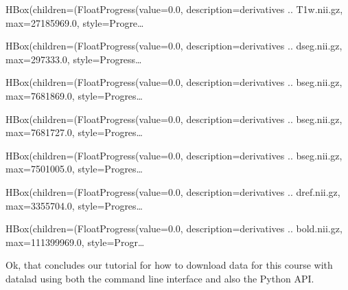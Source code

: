 \documentclass[letterpaper,10pt,english]{sphinxmanual}
\begin{document}
\begin{sphinxVerbatim}[commandchars=\\\{\}]
HBox(children=(FloatProgress(value=0.0, description=\PYGZsq{}derivatives .. \PYGZus{}T1w.nii.gz\PYGZsq{}, max=27185969.0, style=Progre…
\end{sphinxVerbatim}

\begin{sphinxVerbatim}[commandchars=\\\{\}]
HBox(children=(FloatProgress(value=0.0, description=\PYGZsq{}derivatives .. dseg.nii.gz\PYGZsq{}, max=297333.0, style=Progress…
\end{sphinxVerbatim}

\begin{sphinxVerbatim}[commandchars=\\\{\}]
HBox(children=(FloatProgress(value=0.0, description=\PYGZsq{}derivatives .. bseg.nii.gz\PYGZsq{}, max=7681869.0, style=Progres…
\end{sphinxVerbatim}

\begin{sphinxVerbatim}[commandchars=\\\{\}]
HBox(children=(FloatProgress(value=0.0, description=\PYGZsq{}derivatives .. bseg.nii.gz\PYGZsq{}, max=7681727.0, style=Progres…
\end{sphinxVerbatim}

\begin{sphinxVerbatim}[commandchars=\\\{\}]
HBox(children=(FloatProgress(value=0.0, description=\PYGZsq{}derivatives .. bseg.nii.gz\PYGZsq{}, max=7501005.0, style=Progres…
\end{sphinxVerbatim}

\begin{sphinxVerbatim}[commandchars=\\\{\}]
HBox(children=(FloatProgress(value=0.0, description=\PYGZsq{}derivatives .. dref.nii.gz\PYGZsq{}, max=3355704.0, style=Progres…
\end{sphinxVerbatim}

\begin{sphinxVerbatim}[commandchars=\\\{\}]
HBox(children=(FloatProgress(value=0.0, description=\PYGZsq{}derivatives .. bold.nii.gz\PYGZsq{}, max=111399969.0, style=Progr…
\end{sphinxVerbatim}

Ok, that concludes our tutorial for how to download data for this course with datalad using both the command line interface and also the Python API.
\end{document}
